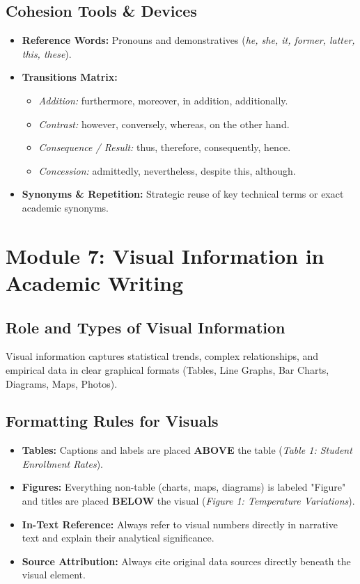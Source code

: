 \documentclass[11pt, a4paper]{article}
\begin{document}
\subsection{Cohesion Tools \& Devices}
\begin{itemize}
    \item \textbf{Reference Words:} Pronouns and demonstratives (\textit{he, she, it, former, latter, this, these}).
    \item \textbf{Transitions Matrix:}
    \begin{itemize}
        \item \textit{Addition:} furthermore, moreover, in addition, additionally.
        \item \textit{Contrast:} however, conversely, whereas, on the other hand.
        \item \textit{Consequence / Result:} thus, therefore, consequently, hence.
        \item \textit{Concession:} admittedly, nevertheless, despite this, although.
    \end{itemize}
    \item \textbf{Synonyms \& Repetition:} Strategic reuse of key technical terms or exact academic synonyms.
\end{itemize}

\newpage

\section{Module 7: Visual Information in Academic Writing}

\subsection{Role and Types of Visual Information}
Visual information captures statistical trends, complex relationships, and empirical data in clear graphical formats (Tables, Line Graphs, Bar Charts, Diagrams, Maps, Photos).

\subsection{Formatting Rules for Visuals}
\begin{mdframed}[style=summarybox]
    \begin{itemize}
        \item \textbf{Tables:} Captions and labels are placed \textbf{ABOVE} the table (\textit{Table 1: Student Enrollment Rates}).
        \item \textbf{Figures:} Everything non-table (charts, maps, diagrams) is labeled "Figure" and titles are placed \textbf{BELOW} the visual (\textit{Figure 1: Temperature Variations}).
        \item \textbf{In-Text Reference:} Always refer to visual numbers directly in narrative text and explain their analytical significance.
        \item \textbf{Source Attribution:} Always cite original data sources directly beneath the visual element.
    \end{itemize}
\end{mdframed}
\end{document}
